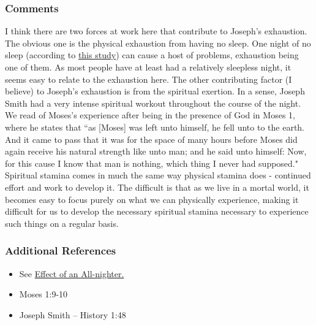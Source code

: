 \documentclass[12pt]{report}
\begin{document}
\subsubsection{Comments\label{js:comments15}}
I think there are two forces at work here that contribute to Joseph's exhaustion.  The obvious one is the physical exhaustion from having no sleep.  One night of no sleep (according to \href{https://www.sciencealert.com/here-s-what-happens-to-your-body-when-you-stay-up-all-night}{this study}) can cause a host of problems, exhaustion being one of them.  As most people have at least had a relatively sleepless night, it seems easy to relate to the exhaustion here.  The other contributing factor (I believe) to Joseph's exhaustion is from the spiritual exertion.  In a sense, Joseph Smith had a very intense spiritual workout throughout the course of the night.  We read of Moses's experience after being in the presence of God in Moses 1, where he states that ``as [Moses] was left unto himself, he fell unto to the earth.  And it came to pass that it was for the space of many hours before Moses did again receive his natural strength like unto man; and he said unto himself: Now, for this cause I know that man is nothing, which thing I never had supposed."  Spiritual stamina comes in much the same way physical stamina does - continued effort and work to develop it.  The difficult is that as we live in a mortal world, it becomes easy to focus purely on what we can physically experience, making it difficult for us to develop the necessary spiritual stamina necessary to experience such things on a regular basis.

\subsubsection{Additional References\label{js:references15}}
\begin{itemize}
\item See \href{https://www.sciencealert.com/here-s-what-happens-to-your-body-when-you-stay-up-all-night}{Effect of an All-nighter.}
\item Moses 1:9-10
\item Joseph Smith -- History 1:48
\end{itemize}

\end{document}
